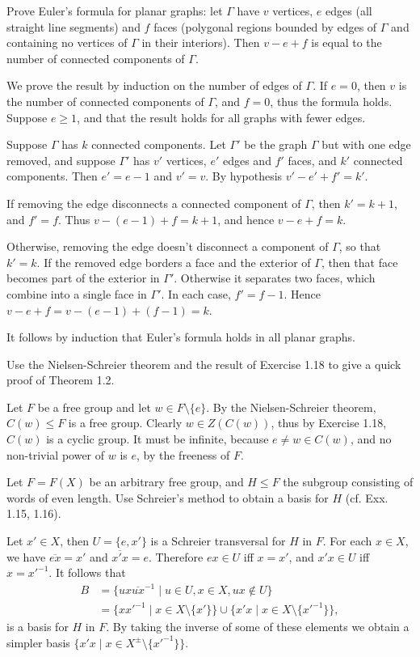 \begin{questions}
\question Prove Euler's formula for planar graphs: let $\Gamma$ have $v$ vertices, $e$ edges (all straight line segments) and $f$ faces (polygonal regions bounded by edges of $\Gamma$ and containing no vertices of $\Gamma$ in their interiors). Then $v-e+f$ is equal to the number of connected components of $\Gamma$.
  \begin{solution}
    We prove the result by induction on the number of edges of $\Gamma$. If $e=0$, then $v$ is the number of connected components of $\Gamma$, and $f=0$, thus the formula holds. Suppose $e\geq1$, and that the result holds for all graphs with fewer edges.

    Suppose $\Gamma$ has $k$ connected components. Let $\Gamma'$ be the graph $\Gamma$ but with one edge removed, and suppose $\Gamma'$ has $v'$ vertices, $e'$ edges and $f'$ faces, and $k'$ connected components. Then $e'=e-1$ and $v'=v$. By hypothesis $v'-e'+f'=k'$.

    If removing the edge disconnects a connected component of $\Gamma$, then $k'=k+1$, and $f'=f$. Thus $v-(e-1)+f=k+1$, and hence $v-e+f=k$.

    Otherwise, removing the edge doesn't disconnect a component of $\Gamma$, so that $k'=k$. If the removed edge borders a face and the exterior of $\Gamma$, then that face becomes part of the exterior in $\Gamma'$. Otherwise it separates two faces, which combine into a single face in $\Gamma'$. In each case, $f'=f-1$. Hence $v-e+f=v-(e-1)+(f-1)=k$.

    It follows by induction that Euler's formula holds in all planar graphs.
  \end{solution}

\question Use the Nielsen-Schreier theorem and the result of Exercise 1.18 to give a quick proof of Theorem 1.2.
  \begin{solution}
    Let $F$ be a free group and let $w\in F\setminus\{e\}$. By the Nielsen-Schreier theorem, $C(w)\leq F$ is a free group. Clearly $w\in Z(C(w))$, thus by Exercise 1.18, $C(w)$ is a cyclic group. It must be infinite, because $e\neq w\in C(w)$, and no non-trivial power of $w$ is $e$, by the freeness of $F$.
  \end{solution}

\question Let $F=F(X)$ be an arbitrary free group, and $H\leq F$ the subgroup consisting of words of even length. Use Schreier's method to obtain a basis for $H$ (cf. Exx. 1.15, 1.16).
  \begin{solution}
    Let $x'\in X$, then $U=\{e,x'\}$ is a Schreier transversal for $H$ in $F$. For each $x\in X$, we have $\overline{ex}=x'$ and $\overline{x'x}=e$. Therefore $ex\in U$ iff $x=x'$, and $x'x\in U$ iff $x=x'^{-1}$. It follows that
    \begin{align*}
      B &= \{ ux\overline{ux}^{-1} \mid u\in U, x\in X, ux\notin U \} \\
        &= \{ xx'^{-1} \mid x\in X\setminus\{x'\} \} \cup \{ x'x \mid x\in X\setminus\{x'^{-1}\} \},
    \end{align*}
    is a basis for $H$ in $F$. By taking the inverse of some of these elements we obtain a simpler basis $\{x'x \mid x\in X^\pm\setminus\{x'^{-1}\}\}$.
  \end{solution}


\end{questions}
